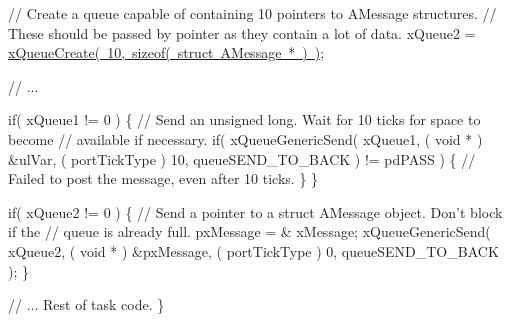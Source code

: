 \begin{DoxyPre}   // Create a queue capable of containing 10 pointers to AMessage structures.
   // These should be passed by pointer as they contain a lot of data.
   xQueue2 = \mbox{\hyperlink{queue_8h_aeb858b824bd74a934ea7ebb81af2a6bb}{xQueueCreate( 10, sizeof( struct AMessage * ) )}};\end{DoxyPre}



\begin{DoxyPre}   // ...\end{DoxyPre}



\begin{DoxyPre}   if( xQueue1 != 0 )
   \{
    // Send an unsigned long.  Wait for 10 ticks for space to become
    // available if necessary.
    if( xQueueGenericSend( xQueue1, ( void * ) \&ulVar, ( portTickType ) 10, queueSEND\_TO\_BACK ) != pdPASS )
    \{
        // Failed to post the message, even after 10 ticks.
    \}
   \}\end{DoxyPre}



\begin{DoxyPre}   if( xQueue2 != 0 )
   \{
    // Send a pointer to a struct AMessage object.  Don't block if the
    // queue is already full.
    pxMessage = \& xMessage;
    xQueueGenericSend( xQueue2, ( void * ) \&pxMessage, ( portTickType ) 0, queueSEND\_TO\_BACK );
   \}\end{DoxyPre}



\begin{DoxyPre}   // ... Rest of task code.
\}
\end{DoxyPre}
 